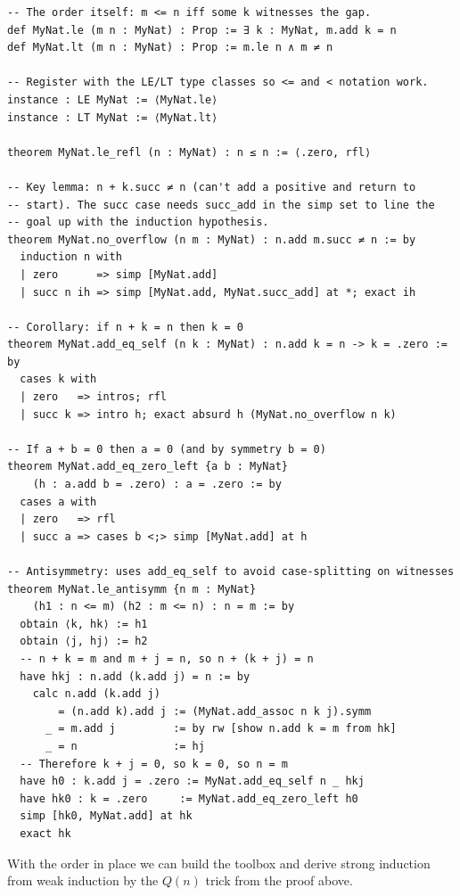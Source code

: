 \documentclass[12pt, openany]{book}
\theoremstyle{plain}
\theoremstyle{definition}
\theoremstyle{remark}
\begin{document}
\begin{leanbox}
\begin{lstlisting}
-- The order itself: m <= n iff some k witnesses the gap.
def MyNat.le (m n : MyNat) : Prop := ∃ k : MyNat, m.add k = n
def MyNat.lt (m n : MyNat) : Prop := m.le n ∧ m ≠ n

-- Register with the LE/LT type classes so <= and < notation work.
instance : LE MyNat := ⟨MyNat.le⟩
instance : LT MyNat := ⟨MyNat.lt⟩

theorem MyNat.le_refl (n : MyNat) : n ≤ n := ⟨.zero, rfl⟩

-- Key lemma: n + k.succ ≠ n (can't add a positive and return to
-- start). The succ case needs succ_add in the simp set to line the
-- goal up with the induction hypothesis.
theorem MyNat.no_overflow (n m : MyNat) : n.add m.succ ≠ n := by
  induction n with
  | zero      => simp [MyNat.add]
  | succ n ih => simp [MyNat.add, MyNat.succ_add] at *; exact ih

-- Corollary: if n + k = n then k = 0
theorem MyNat.add_eq_self (n k : MyNat) : n.add k = n -> k = .zero := by
  cases k with
  | zero   => intros; rfl
  | succ k => intro h; exact absurd h (MyNat.no_overflow n k)

-- If a + b = 0 then a = 0 (and by symmetry b = 0)
theorem MyNat.add_eq_zero_left {a b : MyNat}
    (h : a.add b = .zero) : a = .zero := by
  cases a with
  | zero   => rfl
  | succ a => cases b <;> simp [MyNat.add] at h

-- Antisymmetry: uses add_eq_self to avoid case-splitting on witnesses
theorem MyNat.le_antisymm {n m : MyNat}
    (h1 : n <= m) (h2 : m <= n) : n = m := by
  obtain ⟨k, hk⟩ := h1
  obtain ⟨j, hj⟩ := h2
  -- n + k = m and m + j = n, so n + (k + j) = n
  have hkj : n.add (k.add j) = n := by
    calc n.add (k.add j)
        = (n.add k).add j := (MyNat.add_assoc n k j).symm
      _ = m.add j         := by rw [show n.add k = m from hk]
      _ = n               := hj
  -- Therefore k + j = 0, so k = 0, so n = m
  have h0 : k.add j = .zero := MyNat.add_eq_self n _ hkj
  have hk0 : k = .zero     := MyNat.add_eq_zero_left h0
  simp [hk0, MyNat.add] at hk
  exact hk
\end{lstlisting}
\end{leanbox}
\color{black}

With the order in place we can build the toolbox and derive strong induction from weak induction by the $Q(n)$ trick from the proof above.
\end{document}
